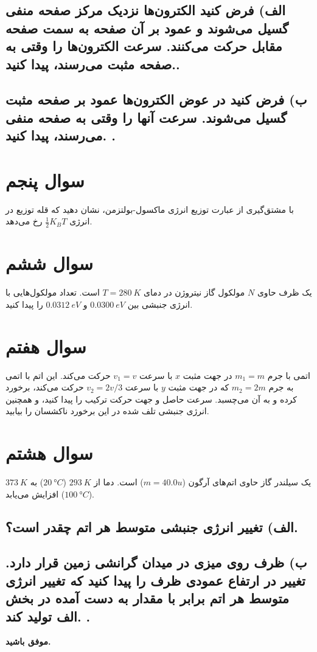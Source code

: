 \documentclass[a4paper,16pt]{article}
\begin{document}
	\subsection*{الف)
		فرض کنید الکترون‌ها نزدیک مرکز صفحه منفی گسیل می‌شوند و عمود بر آن صفحه به سمت صفحه مقابل حرکت می‌کنند. سرعت الکترون‌ها را وقتی به صفحه مثبت می‌رسند، پیدا کنید..}
	\subsection*{ب) فرض کنید در عوض الکترون‌ها عمود بر صفحه مثبت گسیل می‌شوند. سرعت آنها را وقتی به صفحه منفی می‌رسند، پیدا کنید.
		.}
	 
	\section{سوال پنجم}
	با مشتق‌گیری از عبارت توزیع انرژی ماکسول-بولتزمن، نشان دهید که قله توزیع در انرژی $\frac{1}{2} {K_B}T$ رخ می‌دهد.
	
	\section{سوال ششم}
	
	یک ظرف حاوی $N$ مولکول گاز نیتروژن در دمای $T = \SI{280}{K}$ است. تعداد مولکول‌هایی با انرژی جنبشی بین $\SI{0.0300}{eV}$ و $\SI{0.0312}{eV}$ را پیدا کنید.
	
	
	\section{سوال هفتم}
	
	اتمی با جرم $m_1 = m$ در جهت مثبت $x$ با سرعت $v_1 = v$ حرکت می‌کند. این اتم با اتمی به جرم $m_2 = 2m$ که در جهت مثبت $y$ با سرعت $v_2 = 2v/3$ حرکت می‌کند، برخورد کرده و به آن می‌چسبد. سرعت حاصل و جهت حرکت ترکیب را پیدا کنید، و همچنین انرژی جنبشی تلف شده در این برخورد ناکشسان را بیابید.
	\section{سوال هشتم}
	یک سیلندر گاز حاوی اتم‌های آرگون ($m = 40.0 u$) است. دما از $\SI{293}{K}$ ($\SI{20}{\degree C}$) به $\SI{373}{K}$ ($\SI{100}{\degree C}$) افزایش می‌یابد.
	\\
	
	\subsection*{الف) تغییر انرژی جنبشی متوسط هر اتم چقدر است؟.}
	\subsection*{ب) 
		ظرف روی میزی در میدان گرانشی زمین قرار دارد. تغییر در ارتفاع عمودی ظرف را پیدا کنید که تغییر انرژی متوسط هر اتم برابر با مقدار به دست آمده در بخش الف تولید کند.
		.}

	
	
	\vspace{10pt}
	\textbf{موفق باشید.}
\end{document}
